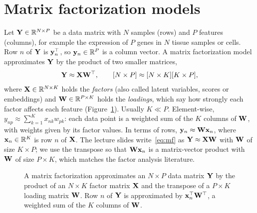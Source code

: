 \section{Matrix factorization models}
\label{sec:mf_models}

Let $\mathbf{Y}\in\mathbb{R}^{N\times P}$ be a data matrix with $N$ samples (rows) and $P$ features (columns), for example the expression of $P$ genes in $N$ tissue samples or cells. Row $n$ of $\mathbf{Y}$ is $\mathbf{y}_n^\top$, so $\mathbf{y}_n\in\mathbb{R}^P$ is a column vector. A matrix factorization model approximates $\mathbf{Y}$ by the product of two smaller matrices,
\begin{equation}
  \mathbf{Y} \approx \mathbf{X}\mathbf{W}^\top, \qquad [N\times P]\approx[N\times K][K\times P],
  \label{eq:mf}
\end{equation}
where $\mathbf{X}\in\mathbb{R}^{N\times K}$ holds the \emph{factors} (also called latent variables, scores or embeddings) and $\mathbf{W}\in\mathbb{R}^{P\times K}$ holds the \emph{loadings}, which say how strongly each factor affects each feature (Figure~\ref{fig:mf_shapes}). Usually $K\ll P$. Element-wise, $y_{np}\approx\sum_{k=1}^K x_{nk}w_{pk}$: each data point is a weighted sum of the $K$ columns of $\mathbf{W}$, with weights given by its factor values. In terms of rows, $\mathbf{y}_n\approx\mathbf{W}\mathbf{x}_n$, where $\mathbf{x}_n\in\mathbb{R}^K$ is row $n$ of $\mathbf{X}$. The lecture slides write~\eqref{eq:mf} as $\mathbf{Y}\approx\mathbf{X}\mathbf{W}$ with $\mathbf{W}$ of size $K\times P$; we use the transpose so that $\mathbf{W}\mathbf{x}_n$ is a matrix-vector product with $\mathbf{W}$ of size $P\times K$, which matches the factor analysis literature.

\begin{figure}[tbp]
  \centering
  \caption{A matrix factorization approximates an $N\times P$ data matrix $\mathbf{Y}$ by the product of an $N\times K$ factor matrix $\mathbf{X}$ and the transpose of a $P\times K$ loading matrix $\mathbf{W}$. Row $n$ of $\mathbf{Y}$ is approximated by $\mathbf{x}_n^\top\mathbf{W}^\top$, a weighted sum of the $K$ columns of $\mathbf{W}$.}
  \label{fig:mf_shapes}
\end{figure}

